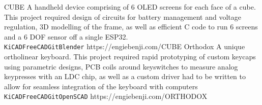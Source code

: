 \documentclass[9pt]{developercv} %
\begin{document}

	\begin{entrylist}
		\QRentry
			{CUBE}
			{A handheld device comprising of 6 OLED screens for each face of a cube. This project required design of circuits for battery management and voltage regulation, 3D modelling of the frame, as well as efficient C code to run 6 screens and a 6 DOF sensor off a single ESP32.\\ \texttt{KiCAD}\slashsep\texttt{FreeCAD}\slashsep\texttt{Git}\slashsep\texttt{Blender}}
			{https://engiebenji.com/CUBE}
		\QRentry
			{Orthodox}
			{A unique ortholinear keyboard. This project required rapid prototyping of custom keycaps using parametric designs, PCB coils around keyswitches to measure analog keypresses with an LDC chip, as well as a custom driver had to be written to allow for seamless integration of the keyboard with computers \\\texttt{KiCAD}\slashsep\texttt{FreeCAD}\slashsep\texttt{Git}\slashsep\texttt{OpenSCAD}}
			{https://engiebenji.com/ORTHODOX}
	\end{entrylist}


\end{document}
